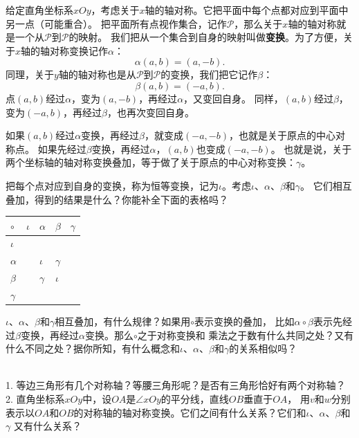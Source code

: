 \documentclass[12pt,UTF8]{ctexbook}
\begin{document}
给定直角坐标系$xOy$，考虑关于$x$轴的轴对称。它把平面中每个点都对应到平面中另一点（可能重合）。
把平面所有点视作集合，记作$\mathcal{P}$，那么关于$x$轴的轴对称就是一个从$\mathcal{P}$到$\mathcal{P}$的映射。
我们把从一个集合到自身的映射叫做\textbf{变换}。为了方便，关于$x$轴的轴对称变换记作$\alpha$：
$$ \alpha (a, b) = (a, -b).$$
同理，关于$y$轴的轴对称也是从$\mathcal{P}$到$\mathcal{P}$的变换，我们把它记作$\beta$：
$$ \beta (a, b) = (-a, b).$$
点$(a, b)$经过$\alpha$，变为$(a, -b)$，再经过$\alpha$，又变回自身。
同样，$(a, b)$经过$\beta$，变为$(-a, b)$，再经过$\beta$，也再次变回自身。

如果$(a, b)$经过$\alpha$变换，再经过$\beta$，就变成$(-a, -b)$，也就是关于原点的中心对称点。
如果先经过$\beta$变换，再经过$\alpha$，$(a, b)$也变成$(-a, -b)$。
也就是说，关于两个坐标轴的轴对称变换叠加，等于做了关于原点的中心对称变换：$\gamma$。

把每个点对应到自身的变换，称为恒等变换，记为$\iota$。考虑$\iota$、$\alpha$、$\beta$和$\gamma$。
它们相互叠加，得到的结果是什么？你能补全下面的表格吗？
\begin{center}
    \begin{tabular}{  | p{2em}<{\centering} | p{2em}<{\centering} | p{2em}<{\centering} | p{2em}<{\centering} | p{2em}<{\centering} | }
        \hline
        $\circ$ & $\iota$ & $\alpha$ & $\beta$ & $\gamma$ \\ [0.5ex] 
        \hline
        $\iota$ &  &  &  &  \\  
        \hline
        $\alpha$ &  & $\iota$ & $\gamma$ &  \\  
        \hline
        $\beta$ &  & $\gamma$ & $\iota$ &  \\  
        \hline
        $\gamma$ &  &  &  &  \\ 
        \hline 
    \end{tabular}
\end{center}
$\iota$、$\alpha$、$\beta$和$\gamma$相互叠加，有什么规律？如果用$\circ$表示变换的叠加，
比如$\alpha \circ \beta$表示先经过$\beta$变换，再经过$\alpha$变换。那么$\circ$之于对称变换和
乘法之于数有什么共同之处？又有什么不同之处？据你所知，有什么概念和$\iota$、$\alpha$、$\beta$和$\gamma$的关系相似吗？

\begin{sk}\label{xt:4-2-0}
    \mbox{}\\
    1. 等边三角形有几个对称轴？等腰三角形呢？是否有三角形恰好有两个对称轴？\\
    2. 直角坐标系$xOy$中，设$OA$是$\angle xOy$的平分线，直线$OB$垂直于$OA$，
    用$v$和$w$分别表示以$OA$和$OB$的对称轴的轴对称变换。它们之间有什么关系？它们和$\iota$、$\alpha$、$\beta$和$\gamma$
    又有什么关系？
\end{sk}
\end{document}
